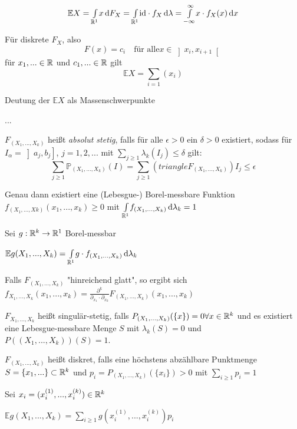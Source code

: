 \documentclass{cheat-sheet}
\renewcommand{\P}{\mathbb{P}} %
\newcommand{\E}{\mathbb{E}} %
\begin{document}

\[ \E X = \Int{\R^1}{}{x}{F_X} = \Int{\R^1}{}{\id \cdot f_X}{\lambda} = \Int{- \infty}{\infty}{x \cdot f_X(x)}{x} \]

\begin{bem}
  Für diskrete $F_X$, also
  \[ F(x) = c_i \quad \text{für alle} x \in \left] x_i, x_{i+1} \right[ \]
  für $x_1, ... \in \mathbb{R}$ und $c_1, ... \in \mathbb{R}$ gilt
  \[ \E X = \sum_{i=1} (x_{i}) \]
\end{bem}


Deutung der $\E X$ als Massenschwerpunkte

...


$F_(X_1, ..., X_k)$ heißt \emph{absolut stetig}, falls für alle $\epsilon > 0$ ein $\delta > 0$ existiert, sodass für $I_{\alpha} = \left] a_j, b_j \right]$, $j = 1, 2, ...$ mit $\sum_{j \geq 1} \lambda_k(I_j) \leq \delta$ gilt:
\[ \sum_{j \geq 1} \P_{(X_1, ..., X_k)}(I) = \sum_{j \geq 1} (triangle F_{(X_1, ..., X_k)}) I_j \leq \epsilon \]

Genau dann existiert eine (Lebesgue-) Borel-messbare Funktion $f_{(X_1, ..., Xk)}(x_1, ..., x_k) \geq 0$ mit ${\textstyle \int\limits_{\mathbb{R}^1}^{}} f_{(X_1, ..., X_k)} \,\mathrm{d} \lambda_k = 1$

Sei $g : \mathbb{R}^k \to \mathbb{R}^1$ Borel-messbar

$\E g(X_1, ..., X_k) = \Int{\R^1}{}{g \cdot f_{(X_1, ..., X_k)}}{\lambda_k}$
 
Falls $F_{(X_1, ..., X_k)}$ "hinreichend glatt", so ergibt sich
$f_{X_1, ..., X_k}(x_1, ..., x_k) = \frac{\partial^k}{\partial_{x_1} \cdot \partial_{x_k}} F_{(X_1, ..., X_k)}(x_1, ..., x_k)$

$F_{X_1, ..., X_k}$ heißt singulär-stetig, falls $P_{(X_1, ..., X_k)}(\{ x \}) = 0 \forall x \in \mathbb{R}^k$
und es existiert eine Lebesgue-messbare Menge $S$ mit $\lambda_k(S) = 0$ und $P((X_1, ..., X_k))(S) = 1$.

$F_{(X_1, ..., X_k)}$ heißt diskret, falls eine höchstens abzählbare Punktmenge $S = \{ x_1, ... \} \subset \mathbb{R}^k$ und $p_i = P_{(X_1, ..., X_k)}(\{ x_i \}) > 0$ mit $\sum_{i \geq 1} p_i = 1$

Sei $x_i = (x_i^{(1)}, ..., x_i^{(k)}) \in \mathbb{R}^k$

$\E g(X_1, ..., X_k) = \sum_{i \geq 1} g(x_i^{(1)}, ..., x_i^{(k)}) p_i$

\end{document}
